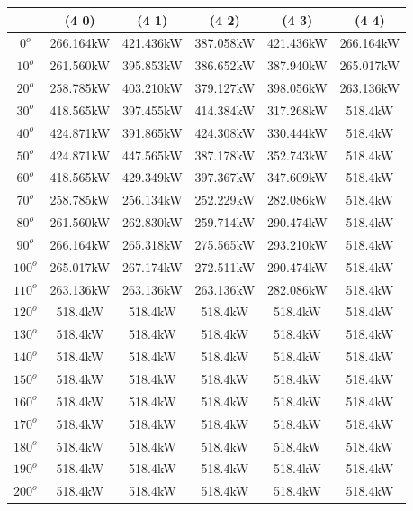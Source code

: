         \begin{table}[H]
        	\centering
        	\begin{tabular}{|c|c|c|c|c|c|} \hline
        			& (4 0)		& (4 1)		& (4 2)		& (4 3)		& (4 4)		\\ \hline
		$0^o$	& 266.164kW	& 421.436kW	& 387.058kW	& 421.436kW	& 266.164kW	\\ \hline
		$10^o$	& 261.560kW	& 395.853kW	& 386.652kW	& 387.940kW	& 265.017kW	\\ \hline
		$20^o$	& 258.785kW	& 403.210kW	& 379.127kW	& 398.056kW	& 263.136kW	\\ \hline
		$30^o$	& 418.565kW	& 397.455kW	& 414.384kW	& 317.268kW	& 518.4kW	\\ \hline
		$40^o$	& 424.871kW	& 391.865kW	& 424.308kW	& 330.444kW	& 518.4kW	\\ \hline
		$50^o$	& 424.871kW	& 447.565kW	& 387.178kW	& 352.743kW	& 518.4kW	\\ \hline
		$60^o$	& 418.565kW	& 429.349kW	& 397.367kW	& 347.609kW	& 518.4kW	\\ \hline
		$70^o$	& 258.785kW	& 256.134kW	& 252.229kW	& 282.086kW	& 518.4kW	\\ \hline
		$80^o$	& 261.560kW	& 262.830kW	& 259.714kW	& 290.474kW	& 518.4kW	\\ \hline
		$90^o$	& 266.164kW	& 265.318kW	& 275.565kW	& 293.210kW	& 518.4kW	\\ \hline
		$100^o$	& 265.017kW	& 267.174kW	& 272.511kW	& 290.474kW	& 518.4kW	\\ \hline
		$110^o$	& 263.136kW	& 263.136kW	& 263.136kW	& 282.086kW	& 518.4kW	\\ \hline
		$120^o$	& 518.4kW	& 518.4kW	& 518.4kW	& 518.4kW	& 518.4kW	\\ \hline
		$130^o$	& 518.4kW	& 518.4kW	& 518.4kW	& 518.4kW	& 518.4kW	\\ \hline
		$140^o$	& 518.4kW	& 518.4kW	& 518.4kW	& 518.4kW	& 518.4kW	\\ \hline
		$150^o$	& 518.4kW	& 518.4kW	& 518.4kW	& 518.4kW	& 518.4kW	\\ \hline
		$160^o$	& 518.4kW	& 518.4kW	& 518.4kW	& 518.4kW	& 518.4kW	\\ \hline
		$170^o$	& 518.4kW	& 518.4kW	& 518.4kW	& 518.4kW	& 518.4kW	\\ \hline
		$180^o$	& 518.4kW	& 518.4kW	& 518.4kW	& 518.4kW	& 518.4kW	\\ \hline
		$190^o$	& 518.4kW	& 518.4kW	& 518.4kW	& 518.4kW	& 518.4kW	\\ \hline
		$200^o$	& 518.4kW	& 518.4kW	& 518.4kW	& 518.4kW	& 518.4kW	\\ \hline

\end{tabular}
\end{table}
